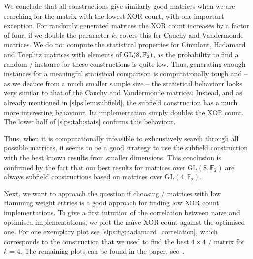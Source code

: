 We conclude that all constructions give similarly good matrices when we are searching for the matrix with the lowest XOR count, with one important exception.
For randomly generated matrices the XOR count increases by a factor of four, if we double the parameter $k$.
 covers this for Cauchy and Vandermonde matrices.
We do not compute the statistical properties for Circulant, Hadamard and Toeplitz matrices with elements of $\mathrm{GL}(8, \mathbb{F}_2)$, as the probability to find a random \MDS/ instance for these constructions is quite low.
Thus, generating enough instances for a meaningful statistical comparison is computationally tough and -- as we deduce from a much smaller sample size -- the statistical behaviour looks very similar to that of the Cauchy and Vandermonde matrices.
Instead, and as already mentioned in \cref{slps:lem:subfield}, the subfield construction has a much more interesting behaviour.
Its implementation simply doubles the XOR count.
The lower half of \cref{slps:tab:stats} confirms this behaviour.

Thus, when it is computationally infeasible to exhaustively search through all possible matrices, it seems to be a good strategy to use the subfield construction with the best known results from smaller dimensions.
This conclusion is confirmed by the fact that our best results for matrices over $\mathrm{GL}(8, \mathbb{F}_2)$ are always subfield constructions based on matrices over $\mathrm{GL}(4, \mathbb{F}_2)$.

Next, we want to approach the question if choosing \MDS/ matrices with low Hamming weight entries is a good approach for finding low XOR count implementations.
To give a first intuition of the correlation between na\"ive and optimised implementations, we plot the na\"ive XOR count against the optimised one.
For one exemplary plot see \cref{slps:fig:hadamard_correlation}, which corresponds to the construction that we used to find the best $4 \times 4$ \MDS/ matrix for $k = 4$.
The remaining plots
can be found in the paper, see~\cite[Appendix~A, Figures~3 to~6]{ToSC:KLSW17}.

